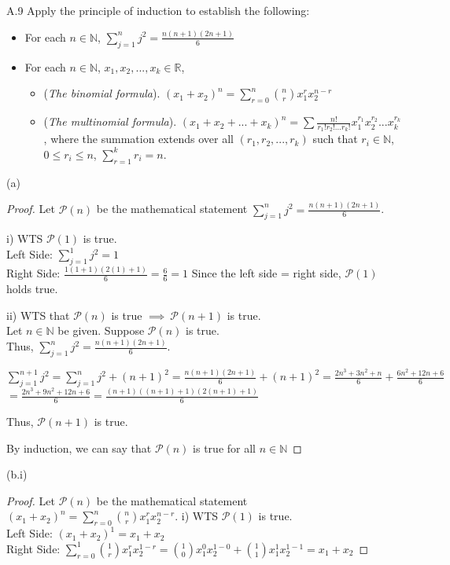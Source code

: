 \documentclass[12pt,letterpaper, onecolumn]{exam}
\newcommand{\real}{\mathbb{R}}
\newcommand{\nat}{\mathbb{N}}
\newcommand{\power}{\mathcal{P}}
\begin{document}
\begin{questions}
    \question A.9 Apply the principle of induction to establish the following:
    \begin{itemize}
    \item[(a)] For each $n \in \nat$, $\sum_{j=1}^n j^2 = \frac{n(n+1)(2n+1)}{6}$
    \item[(b)] For each $n \in \nat$, $x_1,x_2,...,x_k \in \real$,
\begin{itemize}
    \item[(i)] (\textit{The binomial formula}). $(x_1 +x_2 )^n = \sum_{r=0}^n\binom{n}{r}x_1^rx_2^{n-r}$
    \item[(ii)] (\textit{The multinomial formula}).
$(x_1 +x_2 +...+x_k )^n = \sum \frac{n!}{r_1!r_2!...r_k!}x_1^{r_1}x_2^{r_2} ...x_k^{r_k}$,
where the summation extends over all $(r_1,r_2,...,r_k)$ such
that $r_i \in \nat$, \\ $0\leq r_i \leq n$, $\sum^k_{r=1}r_i =n$.
\end{itemize}
\end{itemize}
    \begin{solution}
    (a)
    \begin{proof}
    Let $\power(n)$ be the mathematical statement $\sum_{j=1}^n j^2 = \frac{n(n+1)(2n+1)}{6}$.
    
    i) WTS $\power(1)$ is true. \\
    Left Side: $\sum_{j=1}^1 j^2 = 1$ \\
    Right Side: $\frac{1(1+1)(2(1)+1)}{6} = \frac{6}{6} = 1$
    Since the left side = right side, $\power(1)$ holds true. 

    ii) WTS that $\power(n)$ is true $ \implies \: \power(n+1)$ is true. \\
    Let $n \in \nat$ be given. Suppose $\power(n)$ is true. \\
    Thus, $\sum_{j=1}^n j^2 = \frac{n(n+1)(2n+1)}{6}$.

    $\sum_{j=1}^{n+1} j^2 = \sum_{j=1}^n j^2 + (n+1)^2 = \frac{n(n+1)(2n+1)}{6} + (n+1)^2 = \frac{2n^3 + 3n^2 + n}{6} + \frac{6n^2 + 12n + 6}{6}$ \\
    $ = \frac{2n^3 + 9n^2 +12n + 6}{6} = \frac{(n+1)((n+1) + 1)(2(n+1)+1)}{6}$

    Thus, $\power(n+1)$ is true. 

    By induction, we can say that $\power(n)$ is true for all $n \in \nat$
    \end{proof}

    (b.i) 
    \begin{proof}
     Let $\power(n)$ be the mathematical statement 
    $(x_1 +x_2 )^n = \sum_{r=0}^n\binom{n}{r}x_1^rx_2^{n-r}$.
    i) WTS $\power(1)$ is true. \\
        Left Side:  $(x_1 + x_2)^1 = x_1 + x_2$\\
        Right Side: $\sum_{r=0}^1\binom{1}{r}x_1^rx_2^{1-r} = \binom{1}{0}x_1^0x_2^{1-0} + \binom{1}{1}x_1^1x_2^{1-1} = x_1 + x_2$


\end{proof}
\end{solution}
\end{questions}
\end{document}
